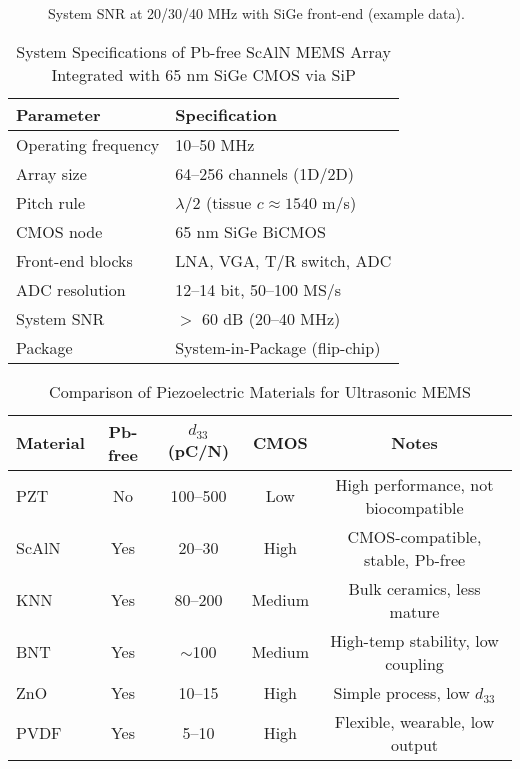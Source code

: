 \documentclass[conference]{IEEEtran}
\begin{document}
\begin{figure}[t]
\centering
{}
\caption{System SNR at 20/30/40 MHz with SiGe front-end (example data).}
\label{fig:snr_freq}
\end{figure}

\begin{table}[t]
\caption{System Specifications of Pb-free ScAlN MEMS Array Integrated with 65 nm SiGe CMOS via SiP}
\label{tab:system_specs}
\centering
\begin{tabular}{|l|l|}
\hline
\textbf{Parameter} & \textbf{Specification} \\ \hline
Operating frequency & 10--50 MHz \\ \hline
Array size & 64--256 channels (1D/2D) \\ \hline
Pitch rule & $\lambda/2$ (tissue $c \approx 1540$ m/s) \\ \hline
CMOS node & 65 nm SiGe BiCMOS \\ \hline
Front-end blocks & LNA, VGA, T/R switch, ADC \\ \hline
ADC resolution & 12--14 bit, 50--100 MS/s \\ \hline
System SNR & $>$ 60 dB (20--40 MHz) \\ \hline
Package & System-in-Package (flip-chip) \\ \hline
\end{tabular}
\end{table}

\begin{table}[t]
\caption{Comparison of Piezoelectric Materials for Ultrasonic MEMS}
\label{tab:materials}
\centering
\begin{tabular}{|l|c|c|c|c|}
\hline
\textbf{Material} & \textbf{Pb-free} & \textbf{$d_{33}$ (pC/N)} & \textbf{CMOS} & \textbf{Notes} \\ \hline
PZT & No  & 100--500 & Low  & High performance, not biocompatible \\ \hline
ScAlN & Yes & 20--30  & High & CMOS-compatible, stable, Pb-free \\ \hline
KNN & Yes & 80--200 & Medium & Bulk ceramics, less mature \\ \hline
BNT & Yes & $\sim$100 & Medium & High-temp stability, low coupling \\ \hline
ZnO  & Yes & 10--15  & High & Simple process, low $d_{33}$ \\ \hline
PVDF & Yes & 5--10   & High & Flexible, wearable, low output \\ \hline
\end{tabular}
\end{table}
\end{document}

